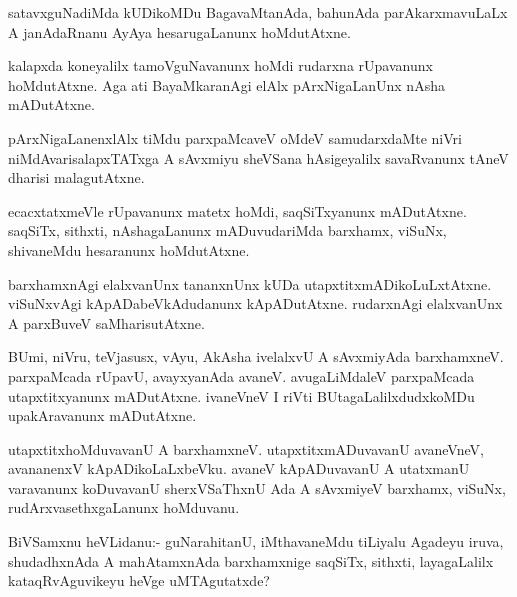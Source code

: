 \documentclass{article}
\begin{document}
\begin{mn}
satavxguNadiMda kUDikoMDu BagavaMtanAda, bahunAda parAkarxmavuLaLx A
janAdaRnanu AyAya hesarugaLanunx hoMdutAtxne.
\end{mn}

\begin{mn}
kalapxda koneyalilx tamoVguNavanunx hoMdi rudarxna rUpavanunx
hoMdutAtxne. Aga ati BayaMkaranAgi elAlx pArxNigaLanUnx nAsha mADutAtxne.
\end{mn}

\begin{mn}%
pArxNigaLanenxlAlx tiMdu parxpaMcaveV oMdeV samudarxdaMte niVri
niMdAvarisalapxTATxga A sAvxmiyu sheVSana hAsigeyalilx savaRvanunx
tAneV dharisi malagutAtxne.
\end{mn}

\begin{mn}
ecacxtatxmeVle rUpavanunx matetx hoMdi, saqSiTxyanunx
mADutAtxne. saqSiTx, sithxti, nAshagaLanunx mADuvudariMda barxhamx,
viSuNx, shivaneMdu hesaranunx hoMdutAtxne.
\end{mn}

\begin{mn}
barxhamxnAgi elalxvanUnx tananxnUnx kUDa
utapxtitxmADikoLuLxtAtxne. viSuNxvAgi kApADabeVkAdudanunx
kApADutAtxne. rudarxnAgi elalxvanUnx A parxBuveV saMharisutAtxne.
\end{mn}

\begin{mn}
BUmi, niVru, teVjasusx, vAyu, AkAsha ivelalxvU A sAvxmiyAda
barxhamxneV. parxpaMcada rUpavU, avayxyanAda avaneV. avugaLiMdaleV
parxpaMcada utapxtitxyanunx mADutAtxne. ivaneVneV I riVti
BUtagaLalilxdudxkoMDu upakAravanunx mADutAtxne.
\end{mn}

\begin{mn}
utapxtitxhoMduvavanU A barxhamxneV. utapxtitxmADuvavanU avaneVneV,
avananenxV kApADikoLaLxbeVku. avaneV kApADuvavanU A utatxmanU
varavanunx koDuvavanU sherxVSaThxnU Ada A sAvxmiyeV barxhamx, viSuNx,
rudArxvasethxgaLanunx hoMduvanu.
\end{mn}

%
%
%


\begin{mn}%
BiVSamxnu heVLidanu:- guNarahitanU, iMthavaneMdu tiLiyalu Agadeyu
iruva, shudadhxnAda A mahAtamxnAda barxhamxnige saqSiTx, sithxti,
layagaLalilx kataqRvAguvikeyu heVge uMTAgutatxde?
\end{mn}
\end{document}
